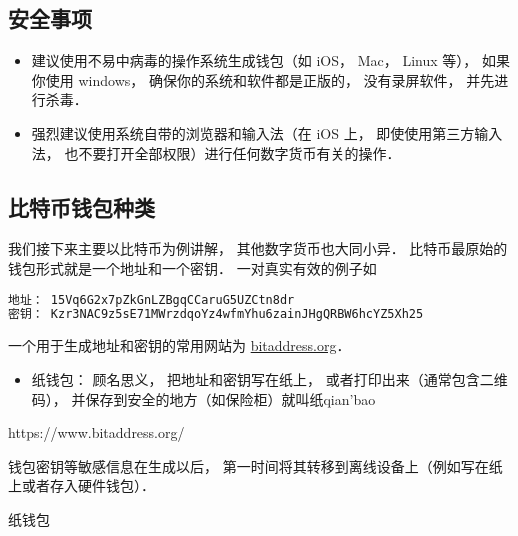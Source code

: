 
\subsection{安全事项}
\begin{itemize}
\item 建议使用不易中病毒的操作系统生成钱包（如 iOS， Mac， Linux 等）， 如果你使用 windows， 确保你的系统和软件都是正版的， 没有录屏软件， 并先进行杀毒．
\item 强烈建议使用系统自带的浏览器和输入法（在 iOS 上， 即使使用第三方输入法， 也不要打开全部权限）进行任何数字货币有关的操作．
\end{itemize}

\subsection{比特币钱包种类}
我们接下来主要以比特币为例讲解， 其他数字货币也大同小异． 比特币最原始的钱包形式就是一个地址和一个密钥． 一对真实有效的例子如
\begin{lstlisting}[language=bash]
地址： 15Vq6G2x7pZkGnLZBgqCCaruG5UZCtn8dr
密钥： Kzr3NAC9z5sE71MWrzdqoYz4wfmYhu6zainJHgQRBW6hcYZ5Xh25
\end{lstlisting}
一个用于生成地址和密钥的常用网站为 \href{https://www.bitaddress.org/}{bitaddress.org}．

\begin{itemize}
\item 纸钱包： 顾名思义， 把地址和密钥写在纸上， 或者打印出来（通常包含二维码）， 并保存到安全的地方（如保险柜）就叫纸qian'bao
\end{itemize}



https://www.bitaddress.org/


钱包密钥等敏感信息在生成以后， 第一时间将其转移到离线设备上（例如写在纸上或者存入硬件钱包）．

纸钱包

